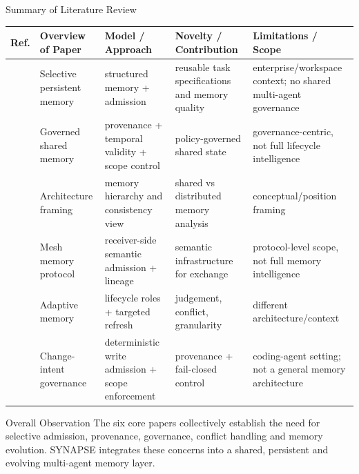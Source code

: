 \begin{frame}{Summary of Literature Review}
\scriptsize
\begin{tabularx}{\textwidth}{p{}p{}p{}p{}X}
\toprule
\textbf{Ref.} & \textbf{Overview of Paper} & \textbf{Model / Approach} & \textbf{Novelty / Contribution} & \textbf{Limitations / Scope} \\
\midrule
\cite{pedada26} & Selective persistent memory & structured memory + admission & reusable task specifications and memory quality & enterprise/workspace context; no shared multi-agent governance\\
\cite{margalit26} & Governed shared memory & provenance + temporal validity + scope control & policy-governed shared state & governance-centric, not full lifecycle intelligence\\
\cite{memoryarch26} & Architecture framing & memory hierarchy and consistency view & shared vs distributed memory analysis & conceptual/position framing\\
\cite{xu26} & Mesh memory protocol & receiver-side semantic admission + lineage & semantic infrastructure for exchange & protocol-level scope, not full memory intelligence\\
\cite{ama26} & Adaptive memory & lifecycle roles + targeted refresh & judgement, conflict, granularity & different architecture/context\\
\cite{claimplane26} & Change-intent governance & deterministic write admission + scope enforcement & provenance + fail-closed control & coding-agent setting; not a general memory architecture\\
\bottomrule
\end{tabularx}
\vspace{2mm}
\begin{block}{Overall Observation}
The six core papers collectively establish the need for selective admission, provenance, governance, conflict handling and memory evolution. SYNAPSE integrates these concerns into a shared, persistent and evolving multi-agent memory layer.
\end{block}
\end{frame}
